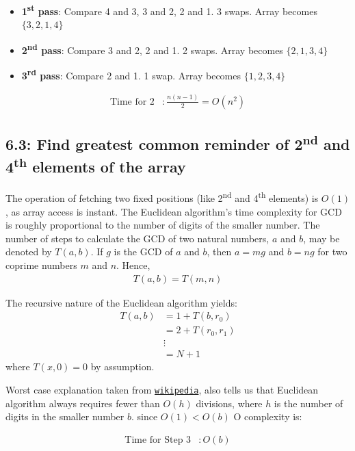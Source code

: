 \documentclass{article}
\begin{document}
\begin{itemize}
  \item \textbf{1\textsuperscript{st} pass}: Compare 4 and 3, 3 and 2, 2 and 1. 3 swaps. Array becomes \( \{3, 2, 1, 4\} \)
  \item \textbf{2\textsuperscript{nd} pass}: Compare 3 and 2, 2 and 1. 2 swaps. Array becomes \( \{2, 1, 3, 4\} \)
  \item \textbf{3\textsuperscript{rd} pass}: Compare 2 and 1. 1 swap. Array becomes \( \{1, 2, 3, 4\} \)
\end{itemize}

\begin{align*}
  \text{Time for 2} & : \frac{n(n-1)}{2} = O(n^2)
\end{align*}

\subsection*{6.3: Find greatest common reminder of 2\textsuperscript{nd} and 4\textsuperscript{th} elements of the array}
The operation of fetching two fixed positions (like 2\textsuperscript{nd} and 4\textsuperscript{th} elements) is \(O(1)\), as array
access is instant.
The Euclidean algorithm's time complexity for GCD is roughly proportional to the number of digits of the smaller number.
The number of steps to calculate the GCD of two natural numbers, \(a\) and \(b\), may be denoted by \(T(a, b)\). If \(g\) is the GCD of \(a\) and \(b\), then \(a = mg\) and \(b = ng\) for two coprime numbers \(m\) and \(n\).
Hence,
\begin{align*}
  T(a, b) = T(m, n)
\end{align*}

The recursive nature of the Euclidean algorithm yields:
\begin{align*}
  T(a, b) & = 1 + T(b, r_0) \\
  & = 2 + T(r_0, r_1) \\
  & \vdots \\
  & = N + 1
\end{align*}
where \(T(x, 0) = 0\) by assumption.

Worst case explanation taken from \href{https://en.wikipedia.org/wiki/Euclidean_algorithm#Algorithmic_efficiency}{\texttt{wikipedia}}, also
tells us that Euclidean algorithm always requires fewer than \(O(h)\) divisions, where \(h\) is the number of digits in the smaller
number \(b\). since $O(1) < O(b)$ O complexity is:

\begin{align*}
  \text{Time for Step 3} & : O(b)
\end{align*}
\end{document}

